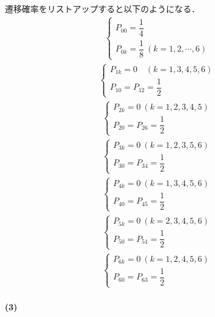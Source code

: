 \documentclass[../../main.tex]{subfiles}
\begin{document}
遷移確率をリストアップすると以下のようになる．
\begin{align}
  \begin{cases}
    P_{00} = \dfrac{1}{4} \\
    P_{0k} = \dfrac{1}{8} \ (k=1,2,\cdots,6)
  \end{cases}
\end{align}
\begin{align}
  \begin{cases}
    P_{1k} = 0 \quad (k=1,3,4,5,6) \\
    P_{10} = P_{12} = \dfrac{1}{2}
  \end{cases}
\end{align}
\begin{align}
  \begin{cases}
    P_{2k} = 0 \ (k=1,2,3,4,5) \\
    P_{20} = P_{26} = \dfrac{1}{2}
  \end{cases}
\end{align}
\begin{align}
  \begin{cases}
    P_{3k} = 0 \ (k=1,2,3,5,6) \\
    P_{30} = P_{34} = \dfrac{1}{2}
  \end{cases}
\end{align}
\begin{align}
  \begin{cases}
    P_{4k} = 0 \ (k=1,3,4,5,6) \\
    P_{40} = P_{45} = \dfrac{1}{2}
  \end{cases}
\end{align}
\begin{align}
  \begin{cases}
    P_{5k} = 0 \ (k=2,3,4,5,6) \\
    P_{50} = P_{51} = \dfrac{1}{2}
  \end{cases}
\end{align}
\begin{align}
  \begin{cases}
    P_{6k} = 0 \ (k=1,2,4,5,6) \\
    P_{60} = P_{63} = \dfrac{1}{2}
  \end{cases}
\end{align}

\paragraph{(3)}
\end{document}
